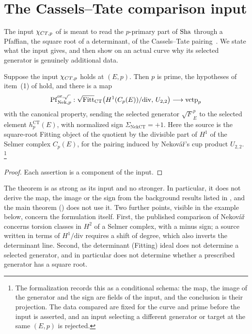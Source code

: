 \section{The Cassels--Tate comparison input}
\label{sec:chi-ct-p}

The input $\chi_{CT,p}$ of  is meant to
read the $p$-primary part of $\operatorname{Sha}$ through a Pfaffian, the square root of
a determinant, of the Cassels--Tate
pairing~\citep{Cassels1962,PoonenStoll1999}.  We state what the input
gives, and then show on an actual curve why its selected generator is
genuinely additional data.

\begin{theorem}\label{thm:closure:chi-ct-p-comparison}
Suppose the input $\chi_{CT,p}$ holds at $(E,p)$.  Then $p$ is prime, the
hypotheses of item~(1) of  hold, and
there is a map
\[
  \operatorname{Pf}_{\mathrm{Nek},p}^{\mathrm{or},\sqrt{\ }}:
  \sqrt{\operatorname{Fitt}}_{\mathrm{CT}}
    \bigl(H^1(C_p(E))/\mathrm{div},\,U_{2,2}\bigr)
  \longrightarrow
  \mathrm{vctp}_p
\]
with the canonical property, sending the selected generator
$\sqrt{F}_E^p$ to the selected element
$h_p^{\mathrm{CT}}(E)$, with normalized sign
$\Sigma_{\mathrm{NekCT}}=+1$.  Here the source is the square-root Fitting
object of the quotient by the divisible part of $H^1$ of the Selmer
complex $C_p(E)$, for the pairing induced by Nekov\'a\v{r}'s cup product
$U_{2,2}$.%
\footnote{The formalization records this as a conditional schema: the
map, the image of the generator and the sign are fields of the input, and
the conclusion is their projection.  The data compared are fixed for the
curve and prime before the input is asserted, and an input selecting a
different generator or target at the same $(E,p)$ is rejected.}
\end{theorem}

\begin{proof}
Each assertion is a component of the input.
\end{proof}

The theorem is as strong as its input and no stronger.  In particular, it
does not derive the map, the image or the sign from the background results
listed in , and the main theorem
() does not use it.  Two further
points, visible in the example below, concern the formulation itself.
First, the published comparison of Nekov\'a\v{r} concerns torsion classes
in $H^2$ of a Selmer complex, with a minus sign; a source written in terms
of $H^1/\mathrm{div}$ requires a shift of degree, which also inverts the
determinant line.  Second, the determinant (Fitting) ideal does not
determine a selected generator, and in particular does not determine
whether a prescribed generator has a square root.

